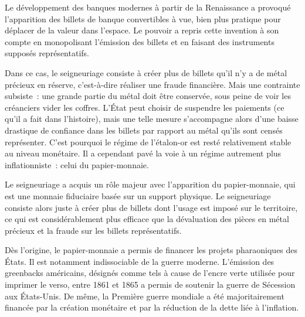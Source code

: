 
Le développement des banques modernes à partir de la Renaissance a provoqué l'apparition des billets de banque convertibles à vue, bien plus pratique pour déplacer de la valeur dans l'espace. Le pouvoir a repris cette invention à son compte en monopolisant l'émission des billets et en faisant des instruments supposés représentatifs.

Dans ce cas, le seigneuriage consiste à créer plus de billets qu'il n'y a de métal précieux en réserve, c'est-à-dire réaliser une fraude financière. Mais une contrainte subsiste~: une grande partie du métal doit être conservée, sous peine de voir les créanciers vider les coffres. L'État peut choisir de suspendre les paiements (ce qu'il a fait dans l'histoire), mais une telle mesure s'accompagne alors d'une baisse drastique de confiance dans les billets par rapport au métal qu'ils sont censés représenter. C'est pourquoi le régime de l'étalon-or est resté relativement stable au niveau monétaire. Il a cependant pavé la voie à un régime autrement plus inflationniste~: celui du papier-monnaie.


Le seigneuriage a acquis un rôle majeur avec l'apparition du papier-monnaie, qui est une monnaie fiduciaire basée sur un support physique. Le seigneuriage consiste alors juste à créer plus de billets dont l'usage est imposé sur le territoire, ce qui est considérablement plus efficace que la dévaluation des pièces en métal précieux et la fraude sur les billets représentatifs.


Dès l'origine, le papier-monnaie a permis de financer les projets pharaoniques des États. Il est notamment indissociable de la guerre moderne. L'émission des greenbacks américains, désignés comme tels à cause de l'encre verte utilisée pour imprimer le verso, entre 1861 et 1865 a permis de soutenir la guerre de Sécession aux États-Unis. De même, la Première guerre mondiale a été majoritairement financée par la création monétaire et par la réduction de la dette liée à l'inflation.

